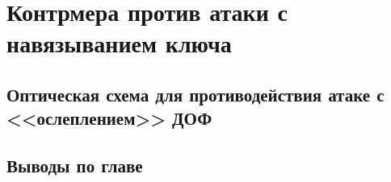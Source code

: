 \chapter{Контрмера против атаки с навязыванием ключа} \label{ch:ch3}

\section{Оптическая схема для противодействия атаке с <<ослеплением>> ДОФ} \label{ch:ch3/sect1}

\section{} \label{ch:ch3/sect2}



\section{Выводы по главе} \label{ch:ch3/sect8}